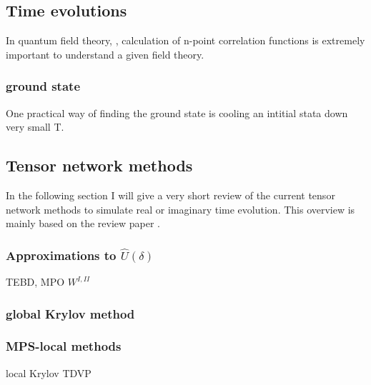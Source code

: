 \subsection{Time evolutions}
In quantum field theory, , calculation of n-point correlation functions is extremely important to understand a given field theory.

\subsubsection{ground state}
One practical way of finding the ground state is cooling an intitial stata down very small T.

\subsection{Tensor network methods}
In the following section I will give a very short review of the current tensor network methods to simulate real or imaginary time evolution. This overview is mainly based on the review paper \cite{Paeckel2019}.


\subsubsection{Approximations to  \texorpdfstring{$ \hat{U}(\delta)$}{U}   }

TEBD, MPO $W^{I,II}$

\subsubsection{global Krylov method }

\subsubsection{MPS-local methods }
local Krylov
TDVP

